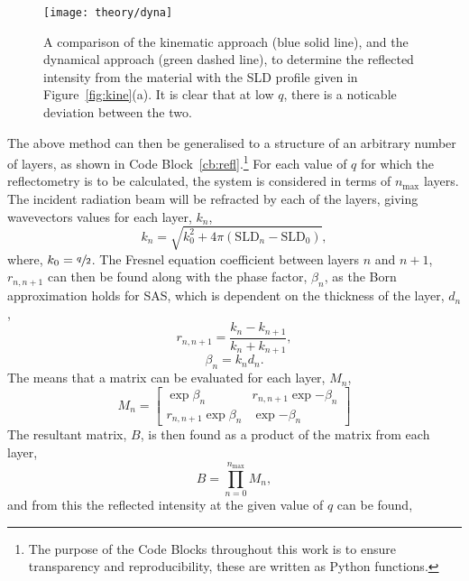 %
\begin{figure}[t]
    \forcerectofloat
    \centering
    \texttt{[image: theory/dyna]}
    \caption{A comparison of the kinematic approach (blue solid line), and the dynamical approach (green dashed line), to determine the reflected intensity from the material with the SLD profile given in Figure~\protect\ref{fig:kine}(a). It is clear that at low $q$, there is a noticable deviation between the two.}
    \label{fig:dyna}
\end{figure}
%
The above method can then be generalised to a structure of an arbitrary number of layers, as shown in Code Block~\ref{cb:refl}.\footnote{The purpose of the Code Blocks throughout this work is to ensure transparency and reproducibility, these are written as Python functions.}
For each value of $q$ for which the reflectometry is to be calculated, the system is considered in terms of $n_{\text{max}}$ layers.
The incident radiation beam will be refracted by each of the layers, giving wavevectors values for each layer, $k_n$,
%
\begin{equation}
    \label{equ:knsld}
    k_n = \sqrt{k_0^2 + 4\pi (\text{SLD}_n - \text{SLD}_0)},
\end{equation}
%
where, $k_0=\sfrac{q}{2}$.
The Fresnel equation coefficient between layers $n$ and $n+1$, $r_{n,n+1}$ can then be found along with the phase factor, $\beta_n$, as the Born approximation holds for SAS, which is dependent on the thickness of the layer, $d_n$,
%
\begin{equation}
    r_{n,n+1} = \frac{k_n - k_{n+1}}{k_n + k_{n+1}},
    \label{equ:fres}
\end{equation}
%
%
\begin{equation}
    \label{equ:nowthick}
    \beta_n = k_n d_n.
\end{equation}
%
The means that a matrix can be evaluated for each layer, $M_n$,
%
\begin{equation}
    M_n =
    \begin{bmatrix}
        \exp{\beta_n} & r_{n,n+1}\exp{-\beta_n} \\ r_{n,n+1}\exp{\beta_n} & \exp{-\beta_n}
    \end{bmatrix}
\end{equation}
%
The resultant matrix, $B$, is then found as a product of the matrix from each layer,
%
\begin{equation}
    B = \prod_{n=0}^{n_{\text{max}}} M_n,
\end{equation}
%
and from this the reflected intensity at the given value of $q$ can be found,
